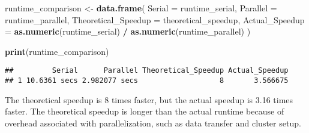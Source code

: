 \documentclass[
]{article}
\newenvironment{Shaded}{\begin{snugshade}}{\end{snugshade}}
\newcommand{\AttributeTok}[1]{\textcolor[rgb]{0.13,0.29,0.53}{#1}}
\newcommand{\FunctionTok}[1]{\textcolor[rgb]{0.13,0.29,0.53}{\textbf{#1}}}
\newcommand{\NormalTok}[1]{#1}
\newcommand{\OtherTok}[1]{\textcolor[rgb]{0.56,0.35,0.01}{#1}}
\newcommand{\SpecialCharTok}[1]{\textcolor[rgb]{0.81,0.36,0.00}{\textbf{#1}}}
\begin{document}
\begin{Shaded}
\begin{Highlighting}[]
\NormalTok{runtime\_comparison }\OtherTok{\textless{}{-}} \FunctionTok{data.frame}\NormalTok{(}
  \AttributeTok{Serial =}\NormalTok{ runtime\_serial,}
  \AttributeTok{Parallel =}\NormalTok{ runtime\_parallel,}
  \AttributeTok{Theoretical\_Speedup =}\NormalTok{ theoretical\_speedup,}
  \AttributeTok{Actual\_Speedup =} \FunctionTok{as.numeric}\NormalTok{(runtime\_serial) }\SpecialCharTok{/} \FunctionTok{as.numeric}\NormalTok{(runtime\_parallel)}
\NormalTok{)}

\FunctionTok{print}\NormalTok{(runtime\_comparison)}
\end{Highlighting}
\end{Shaded}

\begin{verbatim}
##         Serial      Parallel Theoretical_Speedup Actual_Speedup
## 1 10.6361 secs 2.982077 secs                   8       3.566675
\end{verbatim}

The theoretical speedup is 8 times faster, but the actual speedup is
3.16 times faster. The theoretical speedup is longer than the actual
runtime because of overhead associated with parallelization, such as
data transfer and cluster setup.
\end{document}
